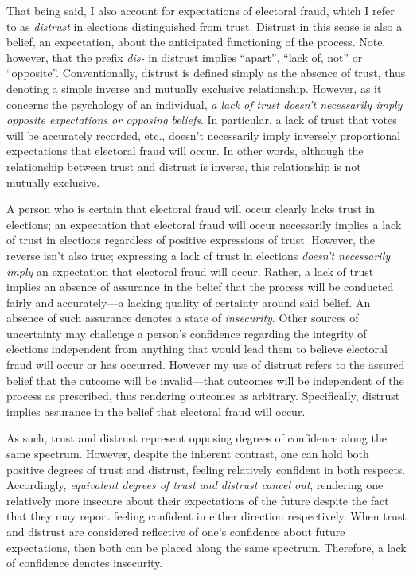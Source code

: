 \documentclass[
  12pt,
  letterpaper,
]{article}
\begin{document}
That being said, I also account for expectations of electoral fraud,
which I refer to as \emph{distrust} in elections distinguished from
trust. Distrust in this sense is also a belief, an expectation, about
the anticipated functioning of the process. Note, however, that the
prefix \emph{dis-} in distrust implies ``apart'', ``lack of, not'' or
``opposite''. Conventionally, distrust is defined simply as the absence
of trust, thus denoting a simple inverse and mutually exclusive
relationship. However, as it concerns the psychology of an individual,
\emph{a lack of trust doesn't necessarily imply opposite expectations or
opposing beliefs}. In particular, a lack of trust that votes will be
accurately recorded, etc., doesn't necessarily imply inversely
proportional expectations that electoral fraud will occur. In other
words, although the relationship between trust and distrust is inverse,
this relationship is not mutually exclusive.

A person who is certain that electoral fraud will occur clearly lacks
trust in elections; an expectation that electoral fraud will occur
necessarily implies a lack of trust in elections regardless of positive
expressions of trust. However, the reverse isn't also true; expressing a
lack of trust in elections \emph{doesn't necessarily imply} an
expectation that electoral fraud will occur. Rather, a lack of trust
implies an absence of assurance in the belief that the process will be
conducted fairly and accurately---a lacking quality of certainty around
said belief. An absence of such assurance denotes a state of
\emph{insecurity}. Other sources of uncertainty may challenge a person's
confidence regarding the integrity of elections independent from
anything that would lead them to believe electoral fraud will occur or
has occurred. However my use of distrust refers to the assured belief
that the outcome will be invalid---that outcomes will be independent of
the process as prescribed, thus rendering outcomes as arbitrary.
Specifically, distrust implies assurance in the belief that electoral
fraud will occur.

As such, trust and distrust represent opposing degrees of confidence
along the same spectrum. However, despite the inherent contrast, one can
hold both positive degrees of trust and distrust, feeling relatively
confident in both respects. Accordingly, \emph{equivalent degrees of
trust and distrust cancel out}, rendering one relatively more insecure
about their expectations of the future despite the fact that they may
report feeling confident in either direction respectively. When trust
and distrust are considered reflective of one's confidence about future
expectations, then both can be placed along the same spectrum.
Therefore, a lack of confidence denotes insecurity.
\end{document}
